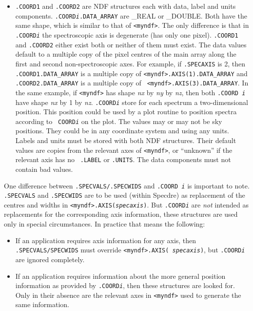 \begin{itemize}

\item{\tt .COORD1} and {\tt .COORD2} are NDF structures each with data,
   label and units components. {\tt .COORD{\it i}.DATA\_ARRAY} are \_REAL
   or \_DOUBLE. Both have the same shape, which is similar to that of
   {\tt <myndf>}. The only difference is that in {\tt .COORD{\it i}} the
   spectroscopic axis is degenerate (has only one pixel). {\tt .COORD1}
   and {\tt .COORD2} either exist both or neither of them must exist.
   The data values default to a multiple copy of the pixel centres of
   the main array along the first and second non-spectroscopic axes. For
   example, if {\tt .SPECAXIS} is 2, then {\tt .COORD1.DATA\_ARRAY} is a
   multiple copy of {\tt <myndf>.AXIS(1).DATA\_ARRAY} and {\tt
   .COORD2.DATA\_ARRAY} is a multiple copy of {\tt
   <myndf>.AXIS(3).DATA\_ARRAY}. In the same example, if {\tt <myndf>}
   has shape {\it nx} by {\it ny} by {\it nz}, then both {\tt .COORD{\it
   i}} have shape {\it nx} by 1 by {\it nz}. {\tt .COORD{\it i}} store
   for each spectrum a two-dimensional position. This position could be
   used by a plot routine to position spectra according to {\tt
   COORD{\it i}} on the plot. The values may or may not be sky
   positions. They could be in any coordinate system and using any
   units. Labels and units must be stored with both NDF
   structures. Their default values are copies from the relevant axes of
   {\tt <myndf>}, or ``unknown'' if the relevant axis has no {\tt
   .LABEL} or {\tt .UNITS}. The data components must not contain bad
   values.

\end{itemize}

   One difference between {\tt .SPECVALS/.SPECWIDS} and {\tt .COORD{\it
   i}} is important to note. {\tt .SPECVALS} and {\tt .SPECWIDS} are to
   be used (within Specdre) as replacement of the centres and widths in
   {\tt <myndf>.AXIS({\it specaxis})}. But {\tt .COORD{\it i}} are {\em
   not\/} intended as replacements for the corresponding axis
   information, these structures are used only in special circumstances.
   In practice that means the following:

\begin{itemize}

\item If an application requires axis information for any axis, then
   {\tt .SPECVALS/SPECWIDS} must override {\tt <myndf>.AXIS({\it
   specaxis})}, but {\tt .COORD{\it i}} are ignored completely.

\item If an application requires information about the more general
   position information as provided by {\tt .COORD{\it i}}, then these
   structures are looked for. Only in their absence are the relevant
   axes in {\tt <myndf>} used to generate the same information.

\end{itemize}

